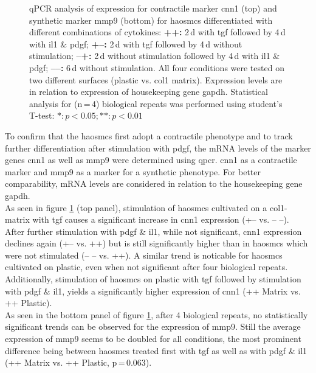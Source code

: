 \begin{figure}[h!]
    	\begin{minipage}{\captionwidth}
    		\caption[CNN_qPCR]{ \newline qPCR analysis of expression for contractile marker \ac{cnn1} (top) and synthetic marker \ac{mmp9} (bottom) for \acp{haosmc} differentiated with different combinations of cytokines:
            \textbf{++:} 2\,d with \ac{tgf} followed by 4\,d with \ac{il1} \& \ac{pdgf};
            \textbf{+–:} 2\,d with \ac{tgf} followed by 4\,d without stimulation;
            \textbf{–+:} 2\,d without stimulation followed by 4\,d with \ac{il1} \& \ac{pdgf};
            \textbf{––:} 6\,d without stimulation.
            All four conditions were tested on two different surfaces (plastic vs. \ac{col1} matrix). Expression levels are in relation to expression of housekeeping gene \ac{gapdh}. Statistical analysis for (n\,=\,4) biological repeats was performed using student's T-test: $*: p < 0.05; **: p < 0.01$}
    		\label{fig:qPCR}
    	\end{minipage}
    \end{figure}

    To confirm that the \acp{haosmc} first adopt a contractile phenotype and to track further differentiation after stimulation with \ac{pdgf}, the mRNA levels of the marker genes \ac{cnn1} as well as \ac{mmp9} were determined using \ac{qpcr}. \ac{cnn1} as a contractile marker and \ac{mmp9} as a marker for a synthetic phenotype. For better comparability, mRNA levels are considered in relation to the housekeeping gene \ac{gapdh}.\\
    As seen in figure \ref{fig:qPCR} (top panel), stimulation of \acp{haosmc} cultivated on a \ac{col1}-matrix with \ac{tgf} causes a significant increase in \ac{cnn1} expression (+– vs. – –). After further stimulation with \ac{pdgf} \& \ac{il1}, while not significant, \ac{cnn1} expression declines again (+– vs. ++) but is still significantly higher than in \acp{haosmc} which were not stimulated (– – vs. ++). A similar trend is noticable for \acp{haosmc} cultivated on plastic, even when not significant after four biological repeats. Additionally, stimulation of \acp{haosmc} on plastic with \ac{tgf} followed by stimulation with \ac{pdgf} \& \ac{il1}, yields a significantly higher expression of \ac{cnn1} (++ Matrix vs. ++ Plastic).\\
    As seen in the bottom panel of figure \ref{fig:qPCR}, after 4 biological repeats, no statistically significant trends can be observed for the expression of \ac{mmp9}. Still the average expression of \ac{mmp9} seems to be doubled for all conditions, the most prominent difference being between \acp{haosmc} treated first with \ac{tgf} as well as with \ac{pdgf} \& \ac{il1} (++ Matrix vs. ++ Plastic, p\,=\,0.063).


